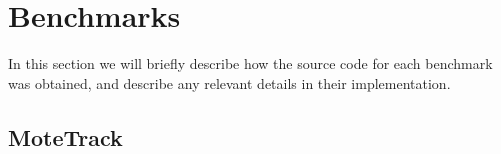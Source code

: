 \section{Benchmarks}
In this section we will briefly describe how the source code for each benchmark was obtained, and describe any relevant details in their implementation.

\subsection{MoteTrack}
\label{sec-evaluation-benchmark-implementation-motetrack}

